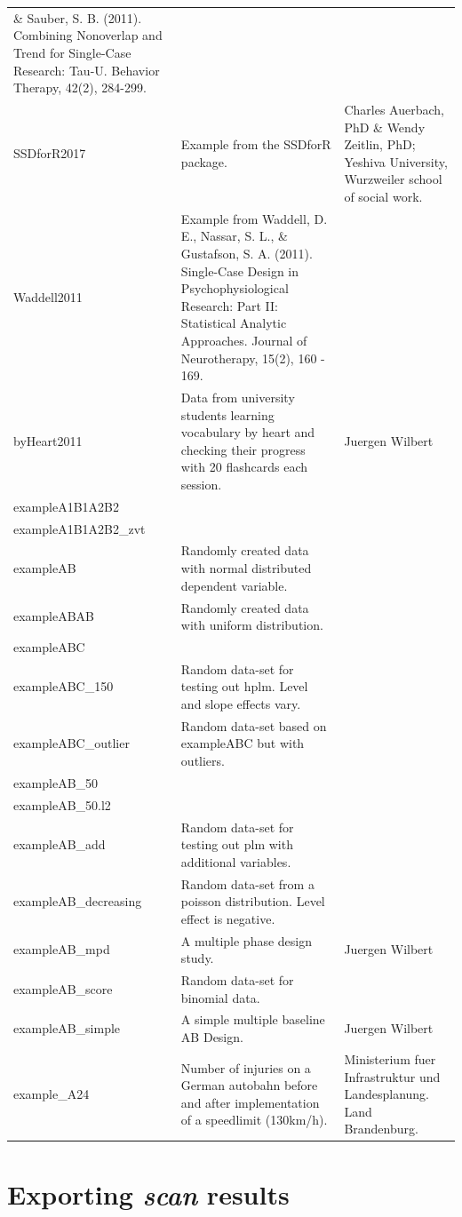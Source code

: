 \documentclass[
  letterpaper,
  DIV=11,
  numbers=noendperiod]{scrreprt}
\begin{document}
\begin{longtable}[]{@{}lll@{}}
\& Sauber, S. B. (2011). Combining Nonoverlap and Trend for Single-Case
Research: Tau-U. Behavior Therapy, 42(2), 284-299. & \\
SSDforR2017 & Example from the SSDforR package. & Charles Auerbach, PhD
\& Wendy Zeitlin, PhD; Yeshiva University, Wurzweiler school of social
work. \\
Waddell2011 & Example from Waddell, D. E., Nassar, S. L., \& Gustafson,
S. A. (2011). Single-Case Design in Psychophysiological Research: Part
II: Statistical Analytic Approaches. Journal of Neurotherapy, 15(2), 160
- 169. & \\
byHeart2011 & Data from university students learning vocabulary by heart
and checking their progress with 20 flashcards each session. & Juergen
Wilbert \\
exampleA1B1A2B2 & & \\
exampleA1B1A2B2\_zvt & & \\
exampleAB & Randomly created data with normal distributed dependent
variable. & \\
exampleABAB & Randomly created data with uniform distribution. & \\
exampleABC & & \\
exampleABC\_150 & Random data-set for testing out hplm. Level and slope
effects vary. & \\
exampleABC\_outlier & Random data-set based on exampleABC but with
outliers. & \\
exampleAB\_50 & & \\
exampleAB\_50.l2 & & \\
exampleAB\_add & Random data-set for testing out plm with additional
variables. & \\
exampleAB\_decreasing & Random data-set from a poisson distribution.
Level effect is negative. & \\
exampleAB\_mpd & A multiple phase design study. & Juergen Wilbert \\
exampleAB\_score & Random data-set for binomial data. & \\
exampleAB\_simple & A simple multiple baseline AB Design. & Juergen
Wilbert \\
example\_A24 & Number of injuries on a German autobahn before and after
implementation of a speedlimit (130km/h). & Ministerium fuer
Infrastruktur und Landesplanung. Land Brandenburg. \\
\bottomrule()
\end{longtable}

\hypertarget{exporting-scan-results}{%
\chapter{\texorpdfstring{Exporting \emph{scan}
results}{Exporting scan results}}\label{exporting-scan-results}}
\end{document}
